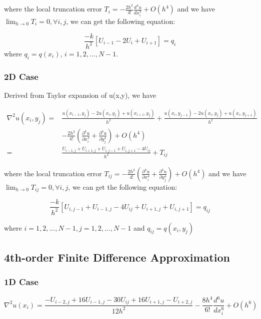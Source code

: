 \documentclass[a4paper]{article}
\begin{document}
where the local truncation error $T_{i} = -\frac{2h^2}{4!}\frac{d^4 u}{d x_i^4} + O(h^4)$ and we have $\lim_{h\rightarrow 0} T_{i} = 0, \forall i,j$, we can get the following equation:

\begin{equation}
   \frac{-k}{h^2} [U_{i-1} - 2U_{i} + U_{i+1}]   = q_{i}
\end{equation}
where $q_i = q(x_i)$,  $i = 1,2,...,N-1$.

\subsubsection{2D Case}
Derived from Taylor expansion of u(x,y), we have

\begin{equation}
    \begin{split}
    \nabla^2u(x_i, y_j) = & \frac{u(x_{i-1},y_j) - 2u(x_i,y_j) + u(x_{i+1},y_j)}{h^2} + \frac{u(x_i,y_{j-1}) - 2u(x_i,y_j) + u(x_i,y_{j+1})}{h^2} \\
    & -\frac{2h^2}{4!}(\frac{\partial^4 u}{\partial x_i^4} + \frac{\partial^4 u}{\partial y_j^4}) + O(h^4)\\ 
    = & \frac{U_{i-1,j} + U_{i+1,j} + U_{i,j-1} + U_{i,j+1} - 4U_{ij} }{h^2} + T_{ij}
    \end{split}
\end{equation}

where the local truncation error $T_{ij} = -\frac{2h^2}{4!}(\frac{\partial^4 u}{\partial x_i^4} + \frac{\partial^4 u}{\partial y_j^4}) + O(h^4)$ and we have $\lim_{h\rightarrow 0} T_{ij} = 0, \forall i,j$, we can get the following equation:

\begin{equation}
   \frac{-k}{h^2} [U_{i,j-1} + U_{i-1,j} - 4U_{ij} + U_{i+1,j} + U_{i,j+1}]   = q_{ij}
\end{equation}

where $ i = 1,2,...,N-1, j = 1,2,...,N-1$ and $q_{ij} = q(x_i,y_j)$

\subsection{4th-order Finite Difference Approximation}

\subsubsection{1D Case}
\begin{equation}
    \nabla^2 u(x_i) = \frac{-U_{i-2,j} + 16U_{i-1,j} - 30U_{ij} + 16 U_{i+1,j} - U_{i+2,j}}{12h^2} -\frac{8h^4}{6!}\frac{d^6 u}{d x_i^6}  + O(h^6)
\end{equation}
\end{document}
